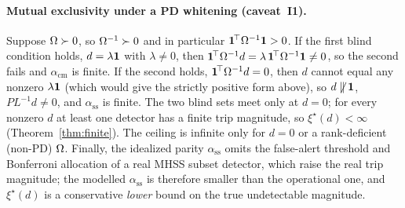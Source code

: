 \paragraph{Mutual exclusivity under a PD whitening (caveat~I1).}
Suppose $\Omega{}\succ0$, so $\Omega^{-1}\succ0$ and in particular
$\bm 1^{\!\top}\Omega^{-1}\bm 1{}>0$. If the first blind condition holds,
$d=\lambda\bm 1{}$ with $\lambda\neq0$, then
$\bm 1^{\!\top}\Omega^{-1}d=\lambda\,\bm 1^{\!\top}\Omega^{-1}\bm 1{}\neq0$, so the
second fails and $\alpha_{\mathrm{cm}}$ is finite. If the second holds,
$\bm 1^{\!\top}\Omega^{-1}d=0$, then $d$ cannot equal any nonzero $\lambda\bm 1{}$
(which would give the strictly positive form above), so $d\not\parallel\bm 1{}$,
$P L^{-1}d\neq0$, and $\alpha_{\mathrm{ss}}$ is finite. The two blind sets meet only
at $d=0$; for every nonzero $d$ at least one detector has a finite trip magnitude,
so $\xi^\star(d)<\infty$ (Theorem~\ref{thm:finite}). The ceiling is infinite only
for $d=0$ or a rank-deficient (non-PD) $\Omega{}$. Finally, the idealized parity
$\alpha_{\mathrm{ss}}$ omits the false-alert threshold and Bonferroni allocation of a
real MHSS subset detector, which raise the real trip magnitude; the modelled
$\alpha_{\mathrm{ss}}$ is therefore smaller than the operational one, and
$\xi^\star(d)$ is a conservative \emph{lower} bound on the true undetectable
magnitude.
